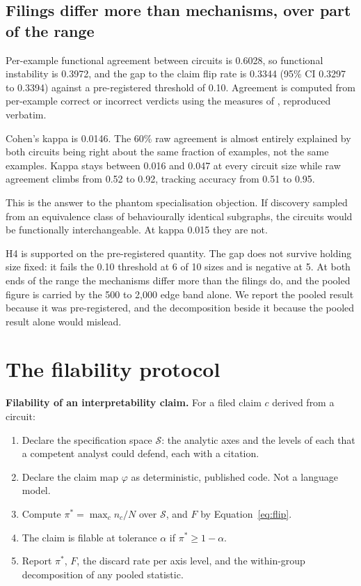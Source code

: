 \documentclass[11pt]{article}
\begin{document}
\subsection{Filings differ more than mechanisms, over part of the range}
\label{sec:functional}

Per-example functional agreement between circuits is 0.6028, so functional
instability is 0.3972, and the gap to the claim flip rate is 0.3344 (95\% CI
0.3297 to 0.3394) against a pre-registered threshold of 0.10. Agreement is
computed from per-example correct or incorrect verdicts using the measures of
\citet{bayatmakou2026}, reproduced verbatim.

Cohen's kappa is 0.0146. The 60\% raw agreement is almost entirely explained by
both circuits being right about the same fraction of examples, not the same
examples. Kappa stays between 0.016 and 0.047 at every circuit size while raw
agreement climbs from 0.52 to 0.92, tracking accuracy from 0.51 to 0.95.

This is the answer to the phantom specialisation objection. If discovery sampled
from an equivalence class of behaviourally identical subgraphs, the circuits would
be functionally interchangeable. At kappa 0.015 they are not.

H4 is supported on the pre-registered quantity. The gap does not survive holding
size fixed: it fails the 0.10 threshold at 6 of 10 sizes and is negative at 5. At both ends of the range the mechanisms differ
more than the filings do, and the pooled figure is carried by the 500 to 2{,}000
edge band alone. We report the pooled result because it was pre-registered, and
the decomposition beside it because the pooled result alone would mislead.

\section{The filability protocol}

\begin{framed}
\noindent\textbf{Filability of an interpretability claim.} For a filed claim $c$
derived from a circuit:
\begin{enumerate}\itemsep2pt
\item Declare the specification space $\mathcal{S}$: the analytic axes and the
levels of each that a competent analyst could defend, each with a citation.
\item Declare the claim map $\varphi$ as deterministic, published code. Not a
language model.
\item Compute $\pi^{*} = \max_c n_c / N$ over $\mathcal{S}$, and $F$ by
Equation~\ref{eq:flip}.
\item The claim is filable at tolerance $\alpha$ if $\pi^{*} \geq 1 - \alpha$.
\item Report $\pi^{*}$, $F$, the discard rate per axis level, and the
within-group decomposition of any pooled statistic.
\end{enumerate}
\end{framed}
\end{document}
